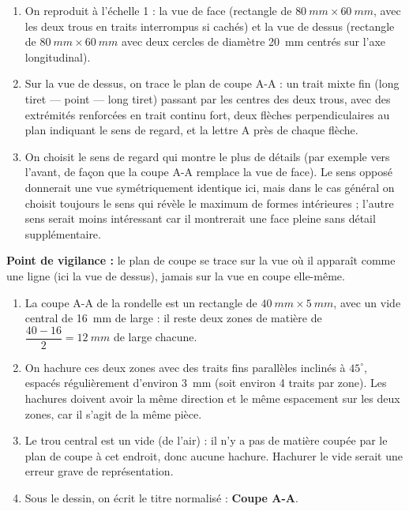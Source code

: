 \documentclass[11pt]{article}
\begin{document}
\begin{corrige}
\begin{enumerate}
\item On reproduit à l'échelle 1 : la vue de face (rectangle de $\SI{80}{mm} \times \SI{60}{mm}$, avec les deux trous en traits interrompus si cachés) et la vue de dessus (rectangle de $\SI{80}{mm} \times \SI{60}{mm}$ avec deux cercles de diamètre \SI{20}{mm} centrés sur l'axe longitudinal).
\item Sur la vue de dessus, on trace le plan de coupe A-A : un trait mixte fin (long tiret — point — long tiret) passant par les centres des deux trous, avec des extrémités renforcées en trait continu fort, deux flèches perpendiculaires au plan indiquant le sens de regard, et la lettre A près de chaque flèche.
\item On choisit le sens de regard qui montre le plus de détails (par exemple vers l'avant, de façon que la coupe A-A remplace la vue de face). Le sens opposé donnerait une vue symétriquement identique ici, mais dans le cas général on choisit toujours le sens qui révèle le maximum de formes intérieures ; l'autre sens serait moins intéressant car il montrerait une face pleine sans détail supplémentaire.
\end{enumerate}
\textbf{Point de vigilance :} le plan de coupe se trace sur la vue où il apparaît comme une ligne (ici la vue de dessus), jamais sur la vue en coupe elle-même.
\end{corrige}

\begin{corrige}
\begin{enumerate}
\item La coupe A-A de la rondelle est un rectangle de $\SI{40}{mm} \times \SI{5}{mm}$, avec un vide central de \SI{16}{mm} de large : il reste deux zones de matière de $\dfrac{40-16}{2} = \SI{12}{mm}$ de large chacune.
\item On hachure ces deux zones avec des traits fins parallèles inclinés à $45^{\circ}$, espacés régulièrement d'environ \SI{3}{mm} (soit environ 4 traits par zone). Les hachures doivent avoir la même direction et le même espacement sur les deux zones, car il s'agit de la même pièce.
\item Le trou central est un vide (de l'air) : il n'y a pas de matière coupée par le plan de coupe à cet endroit, donc aucune hachure. Hachurer le vide serait une erreur grave de représentation.
\item Sous le dessin, on écrit le titre normalisé : \textbf{Coupe A-A}.
\end{enumerate}
\end{corrige}
\end{document}
